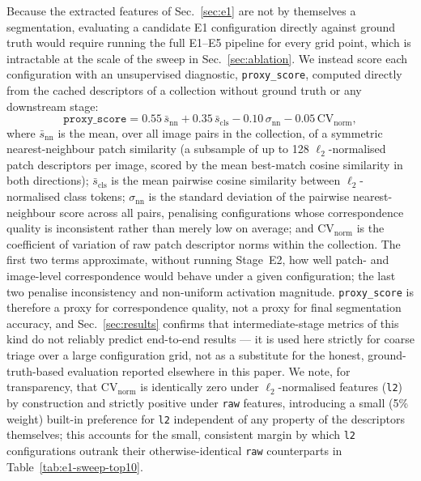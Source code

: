 Because the extracted features of Sec.~\ref{sec:e1} are not by
themselves a segmentation, evaluating a candidate E1 configuration
directly against ground truth would require running the full E1--E5
pipeline for every grid point, which is intractable at the scale of the
sweep in Sec.~\ref{sec:ablation}. We instead score each configuration
with an unsupervised diagnostic, \texttt{proxy\_score}, computed
directly from the cached descriptors of a collection without ground
truth or any downstream stage:
\begin{equation}
\texttt{proxy\_score} = 0.55\,\bar{s}_{\text{nn}} + 0.35\,\bar{s}_{\text{cls}}
  - 0.10\,\sigma_{\text{nn}} - 0.05\,\text{CV}_{\text{norm}},
\end{equation}
where $\bar{s}_{\text{nn}}$ is the mean, over all image pairs in the
collection, of a symmetric nearest-neighbour patch similarity (a
subsample of up to 128 $\ell_2$-normalised patch descriptors per image,
scored by the mean best-match cosine similarity in both directions);
$\bar{s}_{\text{cls}}$ is the mean pairwise cosine similarity between
$\ell_2$-normalised class tokens; $\sigma_{\text{nn}}$ is the
standard deviation of the pairwise nearest-neighbour score across all
pairs, penalising configurations whose correspondence quality is
inconsistent rather than merely low on average; and
$\text{CV}_{\text{norm}}$ is the coefficient of variation of raw patch
descriptor norms within the collection. The first two terms approximate,
without running Stage~E2, how well patch- and image-level correspondence
would behave under a given configuration; the last two penalise
inconsistency and non-uniform activation magnitude.
\texttt{proxy\_score} is therefore a proxy for correspondence quality,
not a proxy for final segmentation accuracy, and Sec.~\ref{sec:results}
confirms that intermediate-stage metrics of this kind do not reliably
predict end-to-end results --- it is used here strictly for coarse
triage over a large configuration grid, not as a substitute for the
honest, ground-truth-based evaluation reported elsewhere in this paper.
We note, for transparency, that $\text{CV}_{\text{norm}}$ is
identically zero under $\ell_2$-normalised features (\texttt{l2}) by
construction and strictly positive under \texttt{raw} features,
introducing a small (5\% weight) built-in preference for \texttt{l2}
independent of any property of the descriptors themselves; this
accounts for the small, consistent margin by which \texttt{l2}
configurations outrank their otherwise-identical \texttt{raw}
counterparts in Table~\ref{tab:e1-sweep-top10}.

